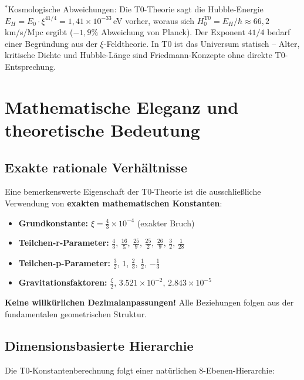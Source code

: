	{\small $^*$Kosmologische Abweichungen: Die T0-Theorie sagt die Hubble-Energie $E_H = E_0 \cdot \xi^{41/4} = 1{,}41 \times 10^{-33}\,$eV vorher, woraus sich $H_0^{\text{T0}} = E_H/\hbar \approx 66{,}2\,$km/s/Mpc ergibt ($-1{,}9\%$ Abweichung von Planck). Der Exponent $41/4$ bedarf einer Begründung aus der $\xi$-Feldtheorie. In T0 ist das Universum statisch -- Alter, kritische Dichte und Hubble-Länge sind Friedmann-Konzepte ohne direkte T0-Entsprechung.}
	
	\section{Mathematische Eleganz und theoretische Bedeutung}
	
	\subsection{Exakte rationale Verhältnisse}
	
	Eine bemerkenswerte Eigenschaft der T0-Theorie ist die ausschließliche Verwendung von \textbf{exakten mathematischen Konstanten}:
	
	\begin{itemize}
		\item \textbf{Grundkonstante:} $\xi = \frac{4}{3} \times 10^{-4}$ (exakter Bruch)
		\item \textbf{Teilchen-r-Parameter:} $\frac{4}{3}$, $\frac{16}{5}$, $\frac{25}{9}$, $\frac{25}{2}$, $\frac{26}{9}$, $\frac{3}{2}$, $\frac{1}{28}$
		\item \textbf{Teilchen-p-Parameter:} $\frac{3}{2}$, $1$, $\frac{2}{3}$, $\frac{1}{2}$, $-\frac{1}{3}$
		\item \textbf{Gravitationsfaktoren:} $\frac{\xi}{2}$, $3.521 \times 10^{-2}$, $2.843 \times 10^{-5}$
	\end{itemize}
	
	\textcolor{t0green}{\textbf{Keine willkürlichen Dezimalanpassungen!}} Alle Beziehungen folgen aus der fundamentalen geometrischen Struktur.
	
	\subsection{Dimensionsbasierte Hierarchie}
	
	Die T0-Konstantenberechnung folgt einer natürlichen 8-Ebenen-Hierarchie:
	
